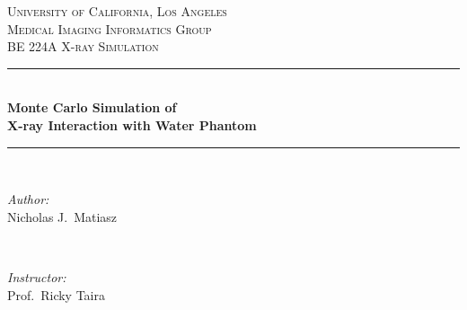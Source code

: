 \documentclass[12pt]{article} %
\begin{document}
\begin{titlepage}

\newcommand{\HRule}{\rule{\linewidth}{0.5mm}} %

\center %
 

\textsc{\Large University of California, Los Angeles}\\[1.5cm] %
\textsc{\large Medical Imaging Informatics Group}\\[0.5cm] %
\textsc{\large BE 224A X-ray Simulation}\\[0.5cm] %

\vspace{20pt}
\HRule \\[0.5cm]
\LARGE{\textbf{Monte Carlo Simulation of}}\\[.3cm]
\LARGE{\textbf{X-ray Interaction with Water Phantom}}\\
\HRule \\[1.5cm]
 

\begin{minipage}{0.4\textwidth}
\begin{flushleft} \large
\emph{Author:}\\
Nicholas J.\ Matiasz %
\end{flushleft}
\end{minipage}
~
\begin{minipage}{0.4\textwidth}
\begin{flushright} \large
\emph{Instructor:} \\
Prof.\ Ricky Taira %
\end{flushright}
\end{minipage}\\[4cm]


\end{titlepage}
\end{document}
